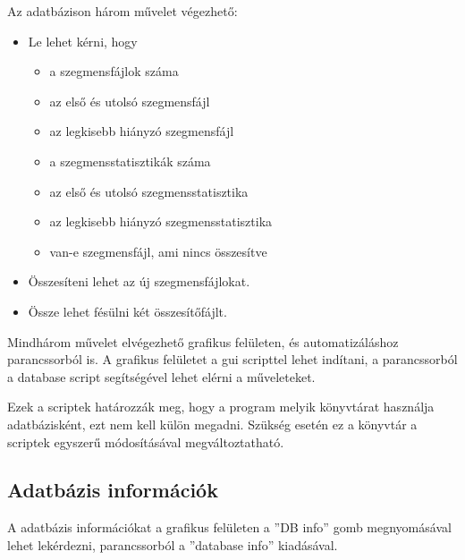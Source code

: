 Az adatbázison három művelet végezhető:
\begin{itemize}

\item Le lehet kérni, hogy
\begin{itemize}
\item a szegmensfájlok száma
\item az első és utolsó szegmensfájl
\item az legkisebb hiányzó szegmensfájl
\item a szegmensstatisztikák száma
\item az első és utolsó szegmensstatisztika
\item az legkisebb hiányzó szegmensstatisztika
\item van-e szegmensfájl, ami nincs összesítve
\end{itemize}

\item Összesíteni lehet az új szegmensfájlokat.

\item Össze lehet fésülni két összesítőfájlt.

\end{itemize}

Mindhárom művelet elvégezhető grafikus felületen, és automatizáláshoz parancssorból is.
A grafikus felületet a gui scripttel lehet indítani, a parancssorból
a database script segítségével lehet elérni a műveleteket.

Ezek a scriptek határozzák meg, hogy a program melyik könyvtárat használja
adatbázisként, ezt nem kell külön megadni.
Szükség esetén ez a könyvtár a scriptek egyszerű módosításával
megváltoztatható.

\subsection{Adatbázis információk}

A adatbázis információkat a grafikus felületen a ''DB info'' gomb megnyomásával lehet
lekérdezni, parancssorból a ''database info'' kiadásával.

